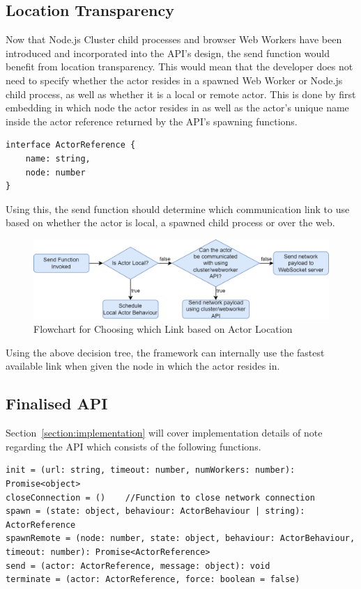 \documentclass[oneside]{um-fict}
\begin{document}
\subsection{Location Transparency}
Now that Node.js Cluster child processes and browser Web Workers have been introduced and incorporated into the API's design, the send function would benefit from location transparency. This would mean that the developer does not need to specify whether the actor resides in a spawned Web Worker or Node.js child process, as well as whether it is a local or remote actor. This is done by first embedding in which node the actor resides in as well as the actor's unique name inside the actor reference returned by the API's spawning functions.
\begin{lstlisting}
interface ActorReference {
    name: string,
    node: number
}
\end{lstlisting}
Using this, the send function should determine which communication link to use based on whether the actor is local, a spawned child process or over the web.
\begin{figure}[H]
    \begin{centering}
        \includegraphics[width=\textwidth]{resources/communication.png}
        \caption{Flowchart for Choosing which Link based on Actor Location}\label{fig:communication}
    \end{centering}
\end{figure}
Using the above decision tree, the framework can internally use the fastest available link when given the node in which the actor resides in.
\subsection{Finalised API}
Section~\ref{section:implementation} will cover implementation details of note regarding the API which consists of the following functions.
\begin{lstlisting}
init = (url: string, timeout: number, numWorkers: number): Promise<object>
closeConnection = ()    //Function to close network connection
spawn = (state: object, behaviour: ActorBehaviour | string): ActorReference
spawnRemote = (node: number, state: object, behaviour: ActorBehaviour, timeout: number): Promise<ActorReference>
send = (actor: ActorReference, message: object): void
terminate = (actor: ActorReference, force: boolean = false)
\end{lstlisting}
\end{document}
